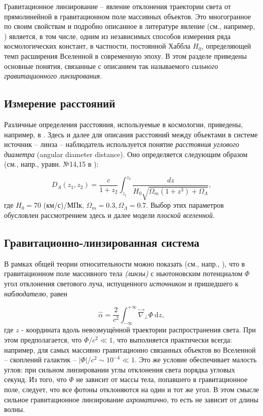 Гравитационное линзирование -- явление отклонения траектории света от прямолинейной в гравитационном поле массивных объектов.  Это многогранное по своим свойствам и подробно описанное в литературе явление (см., например, \cite{gravlensbook}) является, в том числе, одним из независимых способов измерения ряда космологических констант, в частности, постоянной Хаббла $H_0$, определяющей темп расширения Вселенной в современную эпоху. В этом разделе приведены основные понятия, связанные с описанием так называемого \textit{сильного гравитационного линзирования}. 

\subsection{Измерение расстояний}

Различные определения расстояния, используемые в космологии, приведены, например, в \cite{distance_measures}. Здесь и далее для описания расстояний между объектами в системе источник -- линза -- наблюдатель используется понятие \textit{расстояния углового диаметра} (angular diameter distance). Оно определяется следующим образом (см., напр., уравн. №14,15 в \cite{distance_measures}):

\begin{equation}\label{ang_dia_dist}
D_{A}\left(z_{1}, z_{2}\right)=\frac{c}{1+z_{2}} \int_{z_{1}}^{z_{2}} \frac{d z}{H_{0} \sqrt{\Omega_{m}\left(1+z^{3}\right)+\Omega_{\Lambda}}},
\end{equation}
где $H_0=70$ (км/с)/МПк, $\Omega_m=0.3, \Omega_\Lambda=0.7$. Выбор этих параметров обусловлен рассмотрением здесь и далее модели \textit{плоской вселенной}.

\subsection{Гравитационно-линзированная система}

В рамках общей теории относительности можно показать (см., напр., \cite{gl_all}), что в гравитационном поле массивного тела \textit{(линзы)} с ньютоновским потенциалом $\Phi$ угол отклонения светового луча, испущенного \textit{источником} и пришедшего к \textit{наблюдателю}, равен

\begin{equation}
\hat{\alpha}=\frac{2}{c^{2}} \int_{-\infty}^{+\infty} \vec{\nabla}_{\perp} \Phi \ \mathrm{d} z,
\end{equation}
где $z$ - координата вдоль невозмущённой траектории распространения света. При этом предполагается, что $\Phi/c^2 \ll 1$, что выполняется практически всегда: например, для самых массивно гравитационно связанных объектов во Вселенной -- скоплений галактик --  $|\Phi|/c^2 \sim 10^{-4} \ll 1$. Это же условие обеспечивает малость углов: при сильном линзировании углы отклонения света порядка угловых секунд. Из того, что $\Phi$ не зависит от массы тела, попавшего в гравитационное поле, следует, что все фотоны отклоняются на один и тот же угол. В этом смысле сильное гравитационное линзирование \textit{ахроматично}, то есть не зависит от длины волны. 


